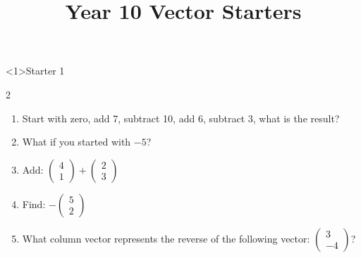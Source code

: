 \documentclass{beamer}
\title{Year 10 Vector Starters}
\date{}
\newcommand{\ashow}[1]{\uncover<2->{\textcolor{red}{\small #1}}}
\begin{document}

\begin{frame}<1>{Starter 1}

\begin{multicols}{2}
\begin{enumerate}
  \item Start with zero, add 7, subtract 10, add 6, subtract 3, what is the result? \ashow{0}
  \item What if you started with $-5$? \ashow{$-5$}
  \item Add:
  $\begin{pmatrix}4\\1\end{pmatrix}
  +
  \begin{pmatrix}2\\3\end{pmatrix}$ \ashow{\(\binom{6}{4}\)}
  \item Find:
  $-\begin{pmatrix}5\\2\end{pmatrix}$ \ashow{\(\binom{-5}{-2}\)}
  \item What column vector represents the reverse of the following vector:
  $\begin{pmatrix}3\\-4\end{pmatrix}$? \ashow{\(\binom{-3}{4}\)}
\end{enumerate}
\end{multicols}

\vspace{0.3cm}



\begin{columns}[T]

\begin{center}
\end{center}


\end{columns}
\end{frame}
\end{document}

